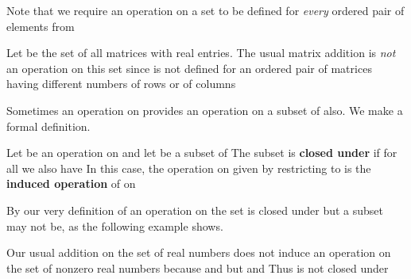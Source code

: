 \documentclass[11pt,oneside]{article}
\begin{document}
\begin{BookBody}

Note that we require an operation on a set  to be defined for\textit{ every} ordered pair  of elements from 

 Let  be the set of all matrices\label{bookfootnote:29:2:ref} with real entries. The usual matrix addition \BookInline{+ } is \textit{not} an operation on this set since  is not defined for an ordered pair  of matrices having different numbers of rows or of columns\BookEnd{\blacktriangle}

Sometimes an operation on  provides an operation on a subset  of  also. We make a formal definition.

 Let \BookInline{\ast } be an operation on  and let  be a subset of  The subset  is\textbf{ closed under} \BookInline{\ast } if for all  we also have  In this case, the operation on  given by restricting \BookInline{\ast } to  is the\textbf{ induced operation} of \BookInline{\ast } on \BookEnd{\blacksquare}

By our very definition of an operation \BookInline{\ast } on  the set  is closed under \BookInline{\ast,\allowbreak } but a subset may not be, as the following example shows.

 Our usual addition \BookInline{+ } on the set  of real numbers does not induce an operation on the set  of nonzero real numbers because  and  but  and  Thus  is not closed under \BookEnd{\blacktriangle}


\end{BookBody}
\end{document}
